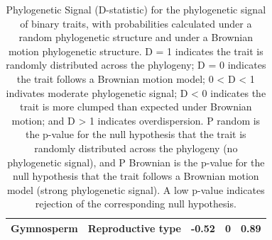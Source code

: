 \documentclass{article}
\begin{document}
\begin{enumerate}
\begin{table}[ht]
\begin{tabular}{lllll}
  Gymnosperm & Reproductive type & -0.52 & 0 & 0.89 \\ 
   \hline
\end{tabular}
\caption{Phylogenetic Signal (D-statistic) for the phylogenetic signal of binary traits, with probabilities calculated under a random phylogenetic structure and under a Brownian motion phylogenetic structure. D = 1 indicates the trait is randomly distributed across the phylogeny; D = 0 indicates the trait follows a Brownian motion model; 0 < D < 1 indivates moderate phylogenetic signal; D < 0 indicates the trait is more clumped than expected under Brownian motion; and D > 1 indicates overdispersion. P random is the p-value for the null hypothesis that the trait is randomly distributed across the phylogeny (no phylogenetic signal), and P Brownian is the p-value for the null hypothesis that the trait follows a Brownian motion model (strong phylogenetic signal). A low p-value indicates rejection of the corresponding null hypothesis.} 
\label{tab:d}
\end{table}

\end{enumerate}
\end{document}
